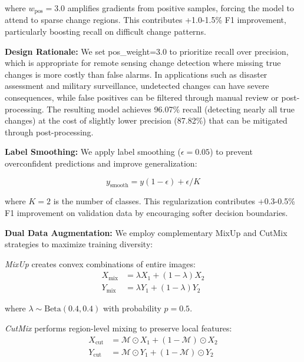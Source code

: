 \documentclass[journal]{IEEEtran}
\begin{document}
where $w_{\text{pos}}=3.0$ amplifies gradients from positive samples, forcing the model to attend to sparse change regions. This contributes +1.0-1.5\% F1 improvement, particularly boosting recall on difficult change patterns.

\textbf{Design Rationale:} We set pos\_weight=3.0 to prioritize recall over precision, which is appropriate for remote sensing change detection where missing true changes is more costly than false alarms. In applications such as disaster assessment and military surveillance, undetected changes can have severe consequences, while false positives can be filtered through manual review or post-processing. The resulting model achieves 96.07\% recall (detecting nearly all true changes) at the cost of slightly lower precision (87.82\%) that can be mitigated through post-processing.

\textbf{Label Smoothing:} We apply label smoothing ($\epsilon=0.05$) to prevent overconfident predictions and improve generalization:

\begin{equation}
y_{\text{smooth}} = y(1-\epsilon) + \epsilon / K
\label{eq:smooth}
\end{equation}

where $K=2$ is the number of classes. This regularization contributes +0.3-0.5\% F1 improvement on validation data by encouraging softer decision boundaries.

\textbf{Dual Data Augmentation:} We employ complementary MixUp and CutMix strategies to maximize training diversity:

\textit{MixUp} creates convex combinations of entire images:
\begin{equation}
\begin{aligned}
X_{\text{mix}} &= \lambda X_1 + (1-\lambda) X_2 \\
Y_{\text{mix}} &= \lambda Y_1 + (1-\lambda) Y_2
\end{aligned}
\label{eq:mixup}
\end{equation}

where $\lambda \sim \text{Beta}(0.4, 0.4)$ with probability $p=0.5$.

\textit{CutMix} performs region-level mixing to preserve local features:
\begin{equation}
\begin{aligned}
X_{\text{cut}} &= \mathcal{M} \odot X_1 + (1-\mathcal{M}) \odot X_2 \\
Y_{\text{cut}} &= \mathcal{M} \odot Y_1 + (1-\mathcal{M}) \odot Y_2
\end{aligned}
\label{eq:cutmix}
\end{equation}
\end{document}
